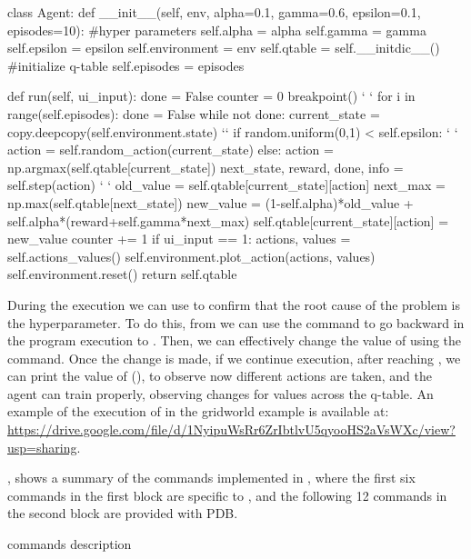 \begin{python}[numbers=left,
	caption={\flik running example of the gridworld environment},
	label={lst:gridworld-learner}]
class Agent:
  def __init__(self, env, alpha=0.1, gamma=0.6, epsilon=0.1, episodes=10):
    #hyper parameters
    self.alpha = alpha
    self.gamma = gamma
    self.epsilon = epsilon
    self.environment = env
    self.qtable = self.__initdic__() #initialize q-table
    self.episodes = episodes
    
  def run(self, ui_input):
      done = False
      counter = 0
      breakpoint()  ` \label{ln:breakpoint} `
      for i in range(self.episodes):
        done = False
        while not done:
          current_state = copy.deepcopy(self.environment.state) `\label{ln:back1}`
          if random.uniform(0,1) < self.epsilon:   ` \label{ln:stop1} `
            action = self.random_action(current_state)
          else:
            action = np.argmax(self.qtable[current_state])  
          next_state, reward, done, info = self.step(action) ` \label{ln:stop2} `
          old_value = self.qtable[current_state][action]
          next_max = np.max(self.qtable[next_state])
          new_value = (1-self.alpha)*old_value + self.alpha*(reward+self.gamma*next_max)
          self.qtable[current_state][action] = new_value
          counter += 1
        if ui_input == 1:
          actions, values = self.actions_values()
          self.environment.plot_action(actions, values)
        self.environment.reset()
    return self.qtable
\end{python}

During the execution we can use \flik to confirm that the root cause of the problem is the  
hyperparameter. To do this, from  we can use the command  to go 
backward in the program execution to . Then, we can effectively change the value of 
 using the  command. Once the change is made, if we 
continue execution, after reaching , we can print the value of  (), 
to observe now different actions are taken, and the agent can train properly, observing changes for 
values across the q-table. An example of the execution of \flik in the gridworld example is available at: 
\url{https://drive.google.com/file/d/1NyipuWsRr6ZrIbtlvU5qyooHS2aVsWXc/view?usp=sharing}.

, shows a summary of the commands implemented in \flik, where the 
first six commands in the first block are specific to \flik, and the following 12 commands in the second 
block are provided with \ac{PDB}.

\begin{table}
  \centering
  
  \caption{\flik commands description}
  \label{tab:flik-commands}
\end{table}


\endinput


